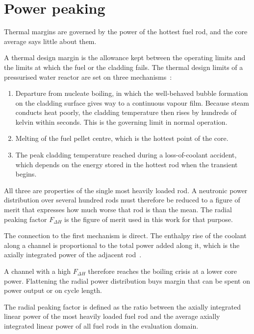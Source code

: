 \section{Power peaking}
\label{sec:bg-peaking}

Thermal margins are governed by the power of the hottest fuel rod, and
the core average says little about them.

A thermal design margin is the allowance kept between the operating
limits and the limits at which the fuel or the cladding fails. The
thermal design limits of a pressurised water reactor are set on three
mechanisms~\cite{todreas_kazimi_2012}:

\begin{enumerate}
  \item Departure from nucleate boiling, in which the well-behaved
        bubble formation on the cladding surface gives way to a
        continuous vapour film. Because steam conducts heat poorly, the
        cladding temperature then rises by hundreds of kelvin within
        seconds. This is the governing limit in normal operation.

  \item Melting of the fuel pellet centre, which is the hottest point
        of the core.

  \item The peak cladding temperature reached during a loss-of-coolant
        accident, which depends on the energy stored in the hottest rod
        when the transient begins.
\end{enumerate}

All three are properties of the single most heavily loaded rod. A
neutronic power distribution over several hundred rods must therefore be
reduced to a figure of merit that expresses how much worse that rod is
than the mean. The radial peaking factor $F_{\Delta H}$ is the figure of
merit used in this work for that purpose.

The connection to the first mechanism is direct. The enthalpy rise of
the coolant along a channel is proportional to the total power added
along it, which is the axially integrated power of the adjacent
rod~\cite{todreas_kazimi_2012}.

A channel with a high $F_{\Delta H}$ therefore reaches the boiling
crisis at a lower core power. Flattening the radial power distribution
buys margin that can be spent on power output or on cycle length.

The radial peaking factor is defined as the ratio between the axially
integrated linear power of the most heavily loaded fuel rod and the
average axially integrated linear power of all fuel rods in the
evaluation domain.

